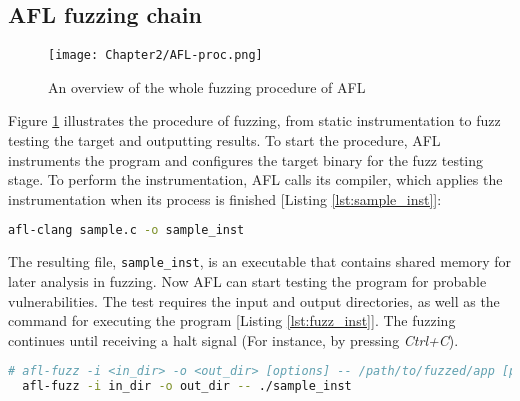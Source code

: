 \subsection{AFL fuzzing chain}

\begin{figure}[!t]
    \texttt{[image: Chapter2/AFL-proc.png]}
    \centering
    \caption{An overview of the whole fuzzing procedure of AFL}
    \label{fig:afl-proc}
\end{figure}

Figure \ref{fig:afl-proc} illustrates the procedure of fuzzing, from static instrumentation to fuzz testing the target and outputting results. To start the procedure, AFL instruments the program and configures the target binary for the fuzz testing stage. To perform the instrumentation, AFL calls its compiler, which applies the instrumentation when its process is finished [Listing \ref{lst:sample_inst}]: 

\begin{lstlisting}[language=bash,style=CommandStyle,label={lst:sample_inst},caption=Instrument $sample\_vul$.c]
    afl-clang sample.c -o sample_inst
\end{lstlisting}

The resulting file, \texttt{sample\_inst}, is an executable that contains shared memory for later analysis in fuzzing. Now AFL can start testing the program for probable vulnerabilities. The test requires the input and output directories, as well as the command for executing the program [Listing \ref{lst:fuzz_inst}]. The fuzzing continues until receiving a halt signal (For instance, by pressing \textit{Ctrl+C}). 

\begin{lstlisting}[language=bash,style=CommandStyle,label={lst:fuzz_inst},caption=Execute AFL]
  # afl-fuzz -i <in_dir> -o <out_dir> [options] -- /path/to/fuzzed/app [params]
  afl-fuzz -i in_dir -o out_dir -- ./sample_inst
\end{lstlisting}
